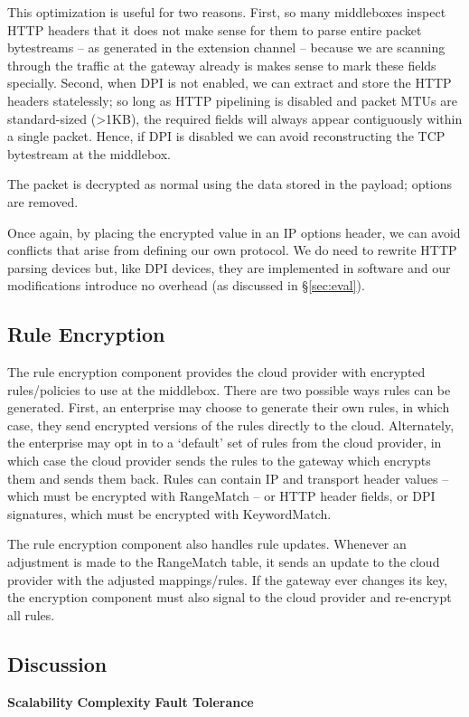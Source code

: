 This optimization is useful for two reasons. First, so many middleboxes inspect HTTP headers that it does not make sense for them to parse entire packet bytestreams -- as generated in the extension channel -- because we are scanning through the traffic at the gateway already is makes sense to mark these fields specially.
Second, when DPI is not enabled, we can extract and store the HTTP headers statelessly; so long as HTTP pipelining is disabled and packet MTUs are standard-sized (>1KB), the required fields will always appear contiguously within a single packet.
Hence, if DPI is disabled we can avoid reconstructing the TCP bytestream at the middlebox.

 The packet is decrypted as normal using the data stored in the payload; options are removed.

Once again, by placing the encrypted value in an IP options header, we can avoid conflicts that arise from defining our own protocol.
We do need to rewrite HTTP parsing devices but, like DPI devices, they are implemented in software and our modifications introduce no overhead (as discussed in \S\ref{sec:eval}).


\subsection{Rule Encryption}
\label{sec:rulenc}

The rule encryption component provides the cloud provider with encrypted rules/policies to use at the middlebox. 
There are two possible ways rules can be generated. First, an enterprise may choose to generate their own rules, in which case, they send encrypted versions of the rules directly to the cloud.
Alternately, the enterprise may opt in to a `default' set of rules from the cloud provider, in which case the cloud provider sends the rules to the gateway which encrypts them and sends them back.
Rules can contain IP and transport header values -- which must be encrypted with RangeMatch -- or HTTP header fields, or DPI signatures, which must be encrypted with KeywordMatch.

The rule encryption component also handles rule updates. 
Whenever an adjustment is made to the RangeMatch table, it sends an update to the cloud provider with the adjusted mappings/rules.
If the gateway ever changes its key, the encryption component must also signal to the cloud provider and re-encrypt all rules.


\subsection{Discussion}
\label{sec:gwdiscuss}
\textbf{Scalability}
\textbf{Complexity}
\textbf{Fault Tolerance}
